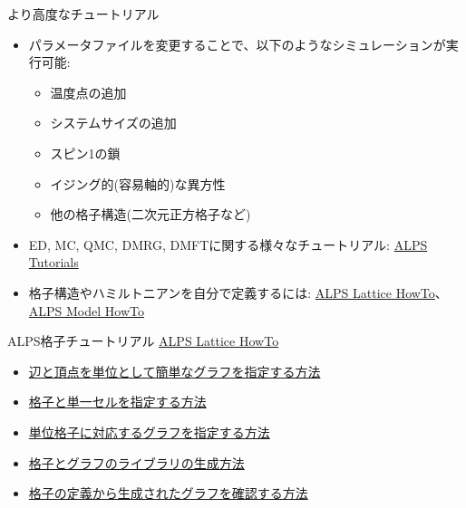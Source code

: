 \begin{frame}[t,fragile]{より高度なチュートリアル}
  \begin{itemize}
  \item パラメータファイルを変更することで、以下のようなシミュレーションが実行可能:
    \begin{itemize}
    \item 温度点の追加
    \item システムサイズの追加
    \item スピン1の鎖
    \item イジング的(容易軸的)な異方性
    \item 他の格子構造(二次元正方格子など)
    \end{itemize}
  \item ED, MC, QMC, DMRG, DMFTに関する様々なチュートリアル: \href{http://alps.comp-phys.org/mediawiki/index.php/ALPS_2_Tutorials:Overview}{ALPS Tutorials}
  \item 格子構造やハミルトニアンを自分で定義するには: \href{http://alps.comp-phys.org/mediawiki/index.php/Tutorials:LatticeHOWTO}{ALPS Lattice HowTo}、\href{http://alps.comp-phys.org/mediawiki/index.php/Tutorials:ModelHOWTO}{ALPS Model HowTo}
  \end{itemize}
\end{frame}

\begin{frame}[t,fragile]{ALPS格子チュートリアル}
  \href{http://alps.comp-phys.org/mediawiki/index.php/Tutorials:LatticeHOWTO/ja}{ALPS Lattice HowTo} \\
  \begin{itemize}
    \item \href{http://alps.comp-phys.org/mediawiki/index.php/Tutorials:LatticeHOWTO:SimpleGraphs/ja}{辺と頂点を単位として簡単なグラフを指定する方法}
    \item \href{http://alps.comp-phys.org/mediawiki/index.php/Tutorials:LatticesAndUnitCells/ja}{格子と単一セルを指定する方法}
    \item \href{http://alps.comp-phys.org/mediawiki/index.php/Tutorials:LatticesAndGraphs/ja}{単位格子に対応するグラフを指定する方法}
    \item \href{http://alps.comp-phys.org/mediawiki/index.php/Tutorials:LatticeHOWTO:Library/ja}{格子とグラフのライブラリの生成方法}
    \item \href{http://alps.comp-phys.org/mediawiki/index.php/Tutorials:LatticeHowto:CheckLattice/ja}{格子の定義から生成されたグラフを確認する方法}
  \end{itemize}
\end{frame}

